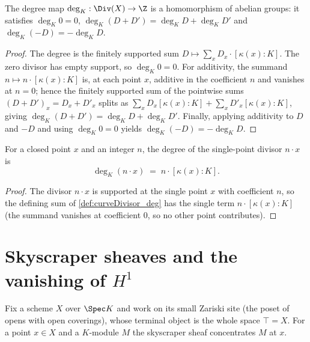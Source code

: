 \begin{theorem}
  \label{thm:curveDivisor_deg_hom}
  \leanok
  The degree map \(\deg_K : \Div(X) \to \Z\) is a homomorphism of abelian groups: it satisfies
  \(\deg_K 0 = 0\), \(\deg_K(D + D') = \deg_K D + \deg_K D'\) and \(\deg_K(-D) = -\deg_K D\).
\end{theorem}
\begin{proof}
  \leanok
  The degree is the finitely supported sum \(D \mapsto \sum_x D_x \cdot [\kappa(x) : K]\). The
  zero divisor has empty support, so \(\deg_K 0 = 0\). For additivity, the summand
  \(n \mapsto n \cdot [\kappa(x) : K]\) is, at each point \(x\), additive in the coefficient
  \(n\) and vanishes at \(n = 0\); hence the finitely supported sum of the pointwise sums
  \((D + D')_x = D_x + D'_x\) splits as \(\sum_x D_x[\kappa(x):K] + \sum_x D'_x[\kappa(x):K]\),
  giving \(\deg_K(D + D') = \deg_K D + \deg_K D'\). Finally, applying additivity to \(D\) and
  \(-D\) and using \(\deg_K 0 = 0\) yields \(\deg_K(-D) = -\deg_K D\).
\end{proof}

\begin{lemma}
  \label{lem:curveDivisor_deg_single}
  \leanok
  For a closed point \(x\) and an integer \(n\), the degree of the single-point divisor
  \(n \cdot x\) is
  \[
    \deg_K(n \cdot x) \;=\; n \cdot [\kappa(x) : K] .
  \]
\end{lemma}
\begin{proof}
  \leanok
  The divisor \(n \cdot x\) is supported at the single point \(x\) with coefficient \(n\), so the
  defining sum of \ref{def:curveDivisor_deg} has the single term \(n \cdot [\kappa(x) : K]\)
  (the summand vanishes at coefficient \(0\), so no other point contributes).
\end{proof}

\section{Skyscraper sheaves and the vanishing of \(H^1\)}

Fix a scheme \(X\) over \(\Spec K\) and work on its small Zariski site (the poset of opens with
open coverings), whose terminal object is the whole space \(\top = X\). For a point \(x \in X\)
and a \(K\)-module \(M\) the skyscraper sheaf concentrates \(M\) at \(x\).

